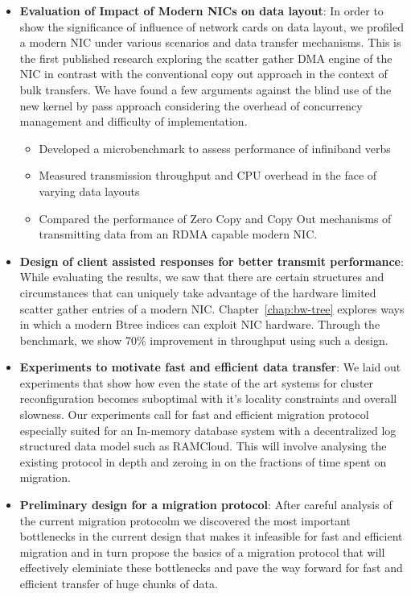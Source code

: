\begin{itemize}

\item{\textbf{Evaluation of Impact of Modern NICs on data layout}}: In order to show 
the significance of influence of network cards on data layout, we profiled a modern NIC under various 
scenarios and data transfer mechanisms. This is the first published research exploring
the scatter gather DMA engine of the NIC in contrast with the conventional copy out approach
in the context of bulk transfers. We have found a few arguments against the blind use of the
new kernel by pass approach considering the overhead of concurrency management and difficulty
of implementation.
\begin{itemize}

\item Developed a microbenchmark to assess performance of infiniband verbs

\item Measured transmission throughput and CPU overhead in the face of varying
data layouts

\item Compared the performance of Zero Copy and Copy Out mechanisms of transmitting
data from an RDMA capable modern NIC.

\end{itemize} 

\item{\textbf{Design of client assisted responses for better transmit performance}}: While evaluating the results,
we saw that there are certain structures and circumstances that can uniquely take advantage of the hardware limited 
scatter gather entries of a modern NIC. Chapter~\ref{chap:bw-tree} explores ways in which a modern Btree indices
can exploit NIC hardware. Through the benchmark, we show 70\% improvement in throughput using such a design.

\item{\textbf{Experiments to motivate fast and efficient data transfer}}: We laid out experiments that  
show how even the state of the art systems for cluster reconfiguration becomes suboptimal with it's locality
constraints and overall slowness. Our experiments call for fast and efficient migration protocol
especially suited for an In-memory database system with a decentralized log structured data model such as RAMCloud.
This will involve analysing the existing protocol in depth and zeroing in on the fractions of time spent on migration.

\item{\textbf{Preliminary design for a migration protocol}}: After careful analysis of the current migration protocolm
we discovered the most important bottlenecks in the current design that makes it infeasible for fast and efficient 
migration and in turn propose the basics of a migration protocol that  will effectively eleminiate these bottlenecks
and pave the way forward for fast and efficient transfer of huge chunks of data.
\end{itemize}


